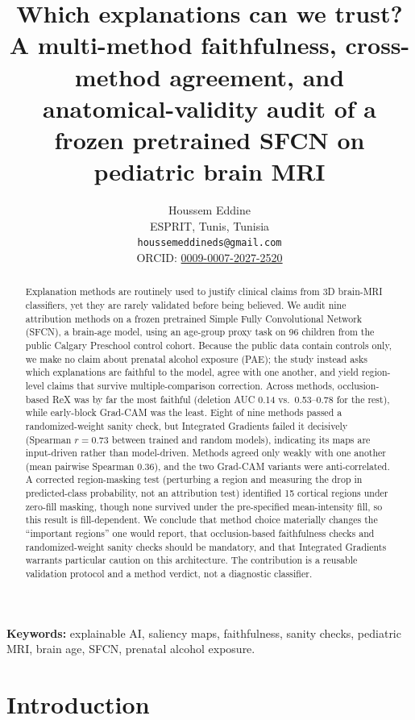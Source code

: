 \documentclass[11pt]{article}
\title{\textbf{Which explanations can we trust? A multi-method faithfulness,
cross-method agreement, and anatomical-validity audit of a frozen pretrained
SFCN on pediatric brain MRI}}
\author{Houssem Eddine\\[2pt]
\small ESPRIT, Tunis, Tunisia\\
\small \texttt{houssemeddineds@gmail.com}\\
\small ORCID: \href{https://orcid.org/0009-0007-2027-2520}{0009-0007-2027-2520}}
\date{}
\begin{document}
\maketitle

\begin{abstract}
\noindent
Explanation methods are routinely used to justify clinical claims from 3D brain-MRI
classifiers, yet they are rarely validated before being believed. We audit nine
attribution methods on a frozen pretrained Simple Fully Convolutional Network (SFCN), a
brain-age model, using an age-group proxy task on 96 children from the public Calgary
Preschool control cohort. Because the public data contain controls only, we make no claim
about prenatal alcohol exposure (PAE); the study instead asks which explanations are
faithful to the model, agree with one another, and yield region-level claims that survive
multiple-comparison correction. Across methods, occlusion-based ReX was by far the most
faithful (deletion AUC 0.14 vs.\ 0.53--0.78 for the rest), while early-block Grad-CAM was
the least. Eight of nine methods passed a randomized-weight sanity check, but Integrated
Gradients failed it decisively (Spearman $r=0.73$ between trained and random models),
indicating its maps are input-driven rather than model-driven. Methods agreed only weakly
with one another (mean pairwise Spearman 0.36), and the two Grad-CAM variants were
anti-correlated. A corrected region-masking test (perturbing a region and measuring the
drop in predicted-class probability, not an attribution test) identified 15 cortical regions
under zero-fill masking, though none survived under the pre-specified mean-intensity fill, so
this result is fill-dependent. We conclude that method choice materially changes
the ``important regions'' one would report, that occlusion-based faithfulness checks and
randomized-weight sanity checks should be mandatory, and that Integrated Gradients warrants
particular caution on this architecture. The contribution is a reusable validation protocol
and a method verdict, not a diagnostic classifier.
\end{abstract}

\textbf{Keywords:} explainable AI, saliency maps, faithfulness, sanity checks, pediatric
MRI, brain age, SFCN, prenatal alcohol exposure.

\section{Introduction}
\end{document}
